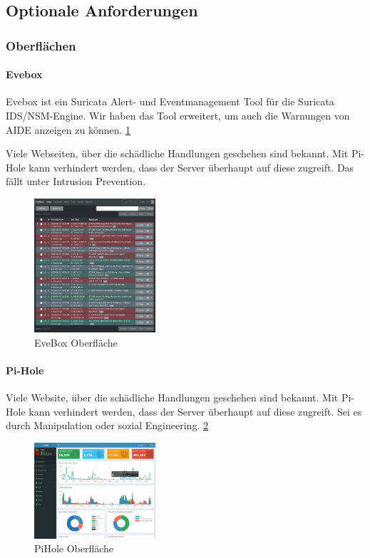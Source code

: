 \documentclass{article}
\begin{document}
\vfil \break

\subsection{Optionale Anforderungen}
\subsubsection{Oberflächen}
\paragraph{Evebox}
Evebox ist ein Suricata Alert- und Eventmanagement Tool für die Suricata IDS/NSM-Engine. Wir haben das Tool erweitert, um auch die Warnungen von AIDE anzeigen zu können. \ref{fig:EveBox}

Viele Webseiten, über die schädliche Handlungen geschehen sind bekannt. Mit Pi-Hole kann verhindert werden, dass der Server überhaupt auf diese zugreift. Das fällt unter Intrusion Prevention.

\begin{figure}[ht]
    \centering
    \includegraphics[width=0.4\textwidth]{assets/EveBox.png}
    \caption[\href{https://evebox.org/}{EveBox von Evebox}]{\label{fig:EveBox}EveBox Oberfläche}
\end{figure}

\paragraph{Pi-Hole}
Viele Website, über die schädliche Handlungen geschehen sind bekannt. Mit Pi-Hole kann verhindert werden, dass der Server überhaupt auf diese zugreift. Sei es durch Manipulation oder sozial Engineering. \ref{fig:PiHole}

\begin{figure}[ht]
    \centering
    \includegraphics[width=0.4\textwidth]{assets/PiHole.png}
    \caption[\href{https://commons.wikimedia.org/w/index.php?curid=71217077}{PiHole von Wikimedia}]{\label{fig:PiHole}PiHole Oberfläche}
\end{figure}
\end{document}
